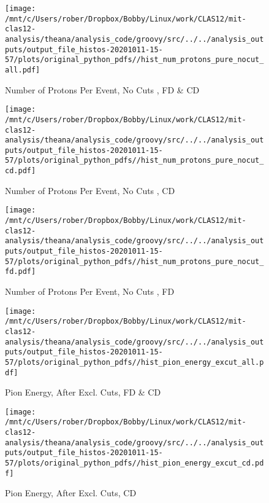 \documentclass{article}
\begin{document}
\begin{landscape}
    \begin{figure}[h]
        \centering

        \texttt{[image: /mnt/c/Users/rober/Dropbox/Bobby/Linux/work/CLAS12/mit-clas12-analysis/theana/analysis\_code/groovy/src/../../analysis\_outputs/output\_file\_histos-20201011-15-57/plots/original\_python\_pdfs//hist\_num\_protons\_pure\_nocut\_all.pdf]}
        \captionsetup{textformat=empty,labelformat=blank}
        \caption{Number of Protons Per Event, No Cuts , FD \& CD}
    \end{figure}
    \clearpage
    
    \begin{figure}[h]
        \centering

        \texttt{[image: /mnt/c/Users/rober/Dropbox/Bobby/Linux/work/CLAS12/mit-clas12-analysis/theana/analysis\_code/groovy/src/../../analysis\_outputs/output\_file\_histos-20201011-15-57/plots/original\_python\_pdfs//hist\_num\_protons\_pure\_nocut\_cd.pdf]}
        \captionsetup{textformat=empty,labelformat=blank}
        \caption{Number of Protons Per Event, No Cuts , CD}
    \end{figure}
    \clearpage
    
    \begin{figure}[h]
        \centering

        \texttt{[image: /mnt/c/Users/rober/Dropbox/Bobby/Linux/work/CLAS12/mit-clas12-analysis/theana/analysis\_code/groovy/src/../../analysis\_outputs/output\_file\_histos-20201011-15-57/plots/original\_python\_pdfs//hist\_num\_protons\_pure\_nocut\_fd.pdf]}
        \captionsetup{textformat=empty,labelformat=blank}
        \caption{Number of Protons Per Event, No Cuts , FD}
    \end{figure}
    \clearpage
    
    \begin{figure}[h]
        \centering

        \texttt{[image: /mnt/c/Users/rober/Dropbox/Bobby/Linux/work/CLAS12/mit-clas12-analysis/theana/analysis\_code/groovy/src/../../analysis\_outputs/output\_file\_histos-20201011-15-57/plots/original\_python\_pdfs//hist\_pion\_energy\_excut\_all.pdf]}
        \captionsetup{textformat=empty,labelformat=blank}
        \caption{Pion Energy, After Excl. Cuts, FD \& CD}
    \end{figure}
    \clearpage
    
    \begin{figure}[h]
        \centering

        \texttt{[image: /mnt/c/Users/rober/Dropbox/Bobby/Linux/work/CLAS12/mit-clas12-analysis/theana/analysis\_code/groovy/src/../../analysis\_outputs/output\_file\_histos-20201011-15-57/plots/original\_python\_pdfs//hist\_pion\_energy\_excut\_cd.pdf]}
        \captionsetup{textformat=empty,labelformat=blank}
        \caption{Pion Energy, After Excl. Cuts, CD}
    \end{figure}
    \clearpage
    

\end{landscape}
\end{document}
